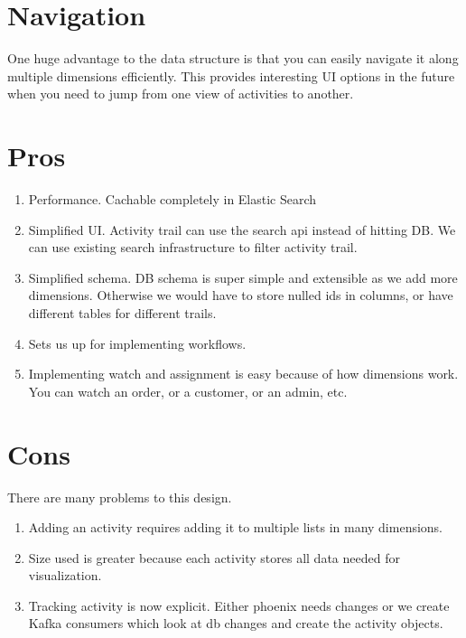 \documentclass[11pt]{article}
\begin{document}
\section{Navigation}

One huge advantage to the data structure is that you can easily navigate it along multiple
dimensions efficiently. This provides interesting UI options in the future when you need
to jump from one view of activities to another.

\section{Pros}
\begin{enumerate}
    \item Performance. Cachable completely in Elastic Search
    \item Simplified UI. Activity trail can use the search api instead of hitting DB.
        We can use existing search infrastructure to filter activity trail.
    \item Simplified schema. DB schema is super simple and extensible as we add more dimensions.
        Otherwise we would have to store nulled ids in columns, or have different tables for
        different trails. 
    \item Sets us up for implementing workflows.
    \item Implementing watch and assignment is easy because of how dimensions work. You can
        watch an order, or a customer, or an admin, etc.
\end{enumerate}

\section{Cons}

There are many problems to this design.

\begin{enumerate}
    \item Adding an activity requires adding it to multiple
lists in many dimensions. 
    \item Size used is greater because each activity stores all data needed for visualization.
    \item Tracking activity is now explicit. Either phoenix needs changes or we create
           Kafka consumers which look at db changes and create the activity objects.
\end{enumerate}
\end{document}
